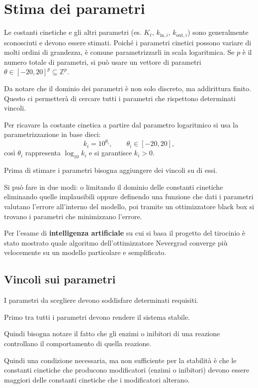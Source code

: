 \chapter{Stima dei parametri}

Le costanti cinetiche e gli altri parametri (es. \(K_\ell\), \(k_{\mathrm{in},i}\), \(k_{\mathrm{out},i}\)) sono generalmente sconosciuti e devono essere stimati. 
Poiché i parametri cinetici possono variare di molti ordini di grandezza, è comune parametrizzarli in scala logaritmica. 
Se \(p\) è il numero totale di parametri, si può usare un vettore di parametri \(\theta\in [-20,20]^p \subseteq \mathbb{Z}^p\).

Da notare che il dominio dei parametri è non solo discreto, ma addirittura finito. Questo ci permetterà di cercare tutti i parametri che rispettono determinati vincoli.

Per ricavare la costante cinetica a partire dal parametro logaritmico si usa la parametrizzazione in base dieci:
\[
k_i = 10^{\theta_i}, \qquad \theta_i \in [-20,20],
\]
così \(\theta_i\) rappresenta \(\log_{10} k_i\) e si garantisce \(k_i>0\).


Prima di stimare i parametri bisogna aggiungere dei vincoli su di essi.

Si può fare in due modi: o limitando il dominio delle constanti cinetiche eliminando quelle implausibili oppure
definendo una funzione che dati i parametri valutano l'errore all'interno del modello, poi tramite un ottimizzatore black box si trovano 
i parametri che minimizzano l'errore.

Per l'esame di \textbf{intelligenza artificiale} su cui si basa il progetto del tirocinio è stato mostrato
quale algoritmo dell'ottimizzatore Nevergrad converge più velocemente su un modello particolare e semplificato.

\section{Vincoli sui parametri}

I parametri da scegliere devono soddisfare determinati requisiti.

Primo tra tutti i parametri devono rendere il sistema stabile.

Quindi bisogna notare il fatto che gli enzimi o inibitori di una reazione controllano il comportamento di quella reazione.

Quindi una condizione necessaria, ma non sufficiente per la stabilità è che le constanti cinetiche che producono modificatori (enzimi o inibitori)
devono essere maggiori delle constanti cinetiche che i modificatori alterano.

